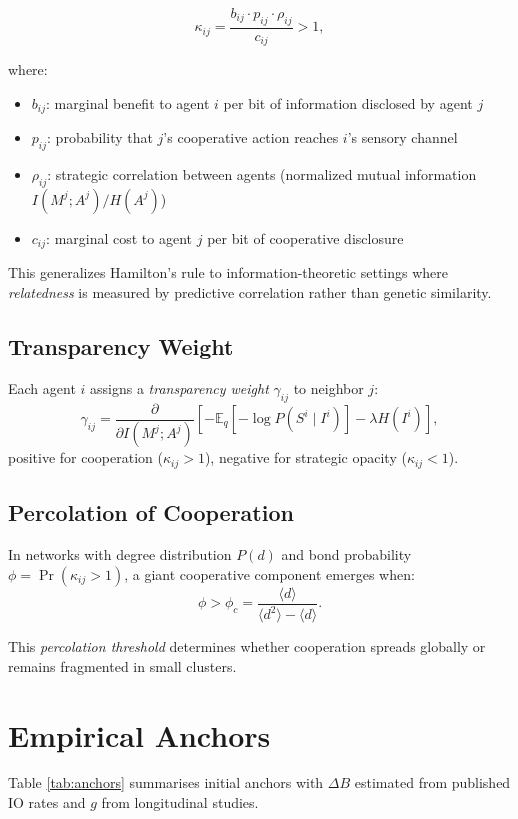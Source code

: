 \documentclass[10pt,conference]{IEEEtran}
\begin{document}
\begin{equation}
\kappa_{ij} = \frac{b_{ij} \cdot p_{ij} \cdot \rho_{ij}}{c_{ij}} > 1,
\end{equation}

where:
\begin{itemize}
\item $b_{ij}$: marginal benefit to agent $i$ per bit of information disclosed by agent $j$
\item $p_{ij}$: probability that $j$'s cooperative action reaches $i$'s sensory channel
\item $\rho_{ij}$: strategic correlation between agents (normalized mutual information $I(M^j;A^j)/H(A^j)$)
\item $c_{ij}$: marginal cost to agent $j$ per bit of cooperative disclosure
\end{itemize}

This generalizes Hamilton's rule to information-theoretic settings where \emph{relatedness} is measured by predictive correlation rather than genetic similarity.

\subsection{Transparency Weight}
Each agent $i$ assigns a \emph{transparency weight} $\gamma_{ij}$ to neighbor $j$:
\begin{equation}
\gamma_{ij} = \frac{\partial}{\partial I(M^j;A^j)} \left[-\mathbb{E}_q[-\log P(S^i \mid I^i)] - \lambda H(I^i)\right],
\end{equation}
positive for cooperation ($\kappa_{ij} > 1$), negative for strategic opacity ($\kappa_{ij} < 1$).

\subsection{Percolation of Cooperation}
In networks with degree distribution $P(d)$ and bond probability $\phi = \Pr(\kappa_{ij} > 1)$, a giant cooperative component emerges when:
\begin{equation}
\phi > \phi_c = \frac{\langle d \rangle}{\langle d^2 \rangle - \langle d \rangle}.
\end{equation}

This \emph{percolation threshold} determines whether cooperation spreads globally or remains fragmented in small clusters.

\section{Empirical Anchors}
\label{sec:anchors}
Table \ref{tab:anchors} summarises initial anchors with \(\Delta B\) estimated from published IO rates and \(g\) from longitudinal studies.
\end{document}
